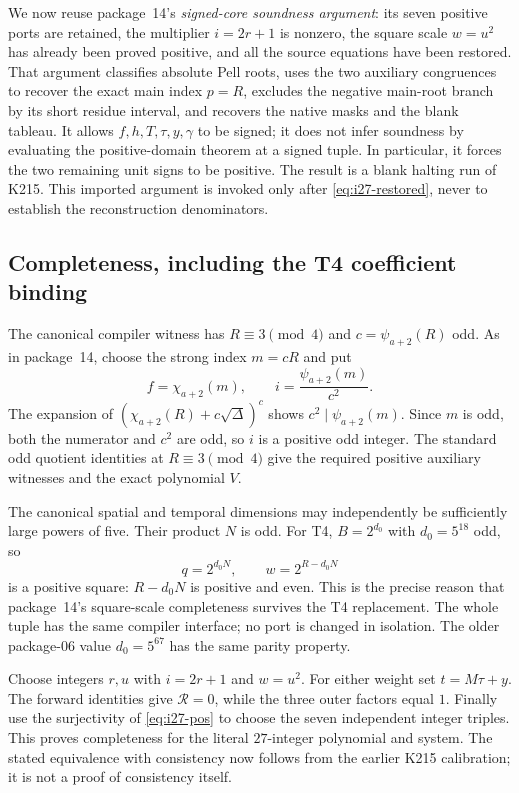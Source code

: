 We now reuse package~14's \emph{signed-core soundness argument}: its
seven positive ports are retained, the multiplier $i=2r+1$ is nonzero,
the square scale $w=u^2$ has already been proved positive, and all the
source equations have been restored. That argument classifies absolute
Pell roots, uses the two auxiliary congruences to recover the exact main
index $p=R$, excludes the negative main-root branch by its short residue
interval, and recovers the native masks and the blank tableau. It allows
$f,h,T,\tau,y,\gamma$ to be signed; it does not infer soundness by
evaluating the positive-domain theorem at a signed tuple. In particular,
it forces the two remaining unit signs to be positive. The result is a
blank halting run of K215. This imported argument is invoked only after
\eqref{eq:i27-restored}, never to establish the reconstruction denominators.

\subsection{Completeness, including the T4 coefficient binding}

The canonical compiler witness has $R\equiv3\pmod4$ and
$c=\psi_{a+2}(R)$ odd. As in package~14, choose the strong index
$m=cR$ and put
\[
 f=\chi_{a+2}(m),\qquad i=\frac{\psi_{a+2}(m)}{c^2}.
\]
The expansion of
$(\chi_{a+2}(R)+c\sqrt\Delta)^c$ shows
$c^2\mid\psi_{a+2}(m)$. Since $m$ is odd, both the numerator and
$c^2$ are odd, so $i$ is a positive odd integer. The standard odd quotient
identities at $R\equiv3\pmod4$ give the required positive auxiliary
witnesses and the exact polynomial $V$.

The canonical spatial and temporal dimensions may independently be
sufficiently large powers of five. Their product $N$ is odd. For T4,
$B=2^{d_0}$ with $d_0=5^{18}$ odd, so
\[
 q=2^{d_0N},\qquad w=2^{R-d_0N}
\]
is a positive square: $R-d_0N$ is positive and even. This is the precise
reason that package~14's square-scale completeness survives the T4
replacement. The whole tuple has the same compiler interface; no port is
changed in isolation. The older package-06 value $d_0=5^{67}$ has the same
parity property.

Choose integers $r,u$ with $i=2r+1$ and $w=u^2$. For either weight set
$t=M\tau+y$. The forward identities give $\mathcal R=0$, while the
three outer factors equal $1$. Finally use the surjectivity of
\eqref{eq:i27-pos} to choose the seven independent integer triples.
This proves completeness for the literal $27$-integer polynomial and
system. The stated equivalence with consistency now follows from the
earlier K215 calibration; it is not a proof of consistency itself.

